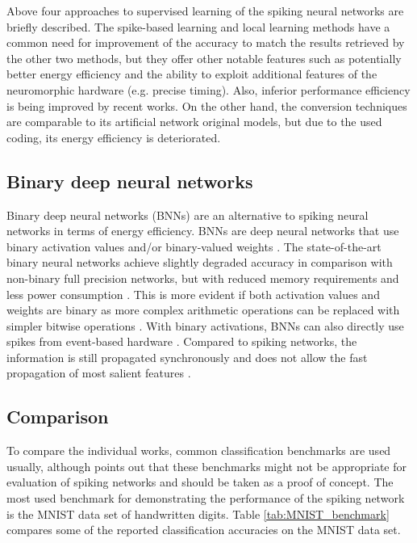 Above four approaches to supervised learning of the spiking neural networks are briefly described. The spike-based learning and local learning methods have a common need for improvement of the accuracy to match the results retrieved by the other two methods, but they offer other notable features such as potentially better energy efficiency and the ability to exploit additional features of the neuromorphic hardware (e.g. precise timing). Also, inferior performance efficiency is being improved by recent works. On the other hand, the conversion techniques are comparable to its artificial network original models, but due to the used coding, its energy efficiency is deteriorated.

\subsection{Binary deep neural networks}
Binary deep neural networks (BNNs) are an alternative to spiking neural networks in terms of energy efficiency. BNNs are deep neural networks that use binary activation values and/or binary-valued weights \cite{simonsReviewBinarized19}. The state-of-the-art binary neural networks achieve slightly degraded accuracy in comparison with non-binary full precision networks, but with reduced memory requirements and less power consumption \cite{courbariauxBinarizedNeural16}. This is more evident if both activation values and weights are binary as more complex arithmetic operations can be replaced with simpler bitwise operations \cite{kimBitwiseNeural16}. With binary activations, BNNs can also directly use spikes from event-based hardware \cite{linAccurateBinary17}. Compared to spiking networks, the information is still propagated synchronously and does not allow the fast propagation of most salient features \cite{pfeifferDeepLearningSpiking2018}.

\subsection{Comparison}
To compare the individual works, common classification benchmarks are used usually, although \cite{pfeifferDeepLearningSpiking2018} points out that these benchmarks might not be appropriate for evaluation of spiking networks and should be taken as a proof of concept. The most used benchmark for demonstrating the performance of the spiking network is the MNIST data set of handwritten digits. Table \ref{tab:MNIST_benchmark} compares some of the reported classification accuracies on the MNIST data set.

